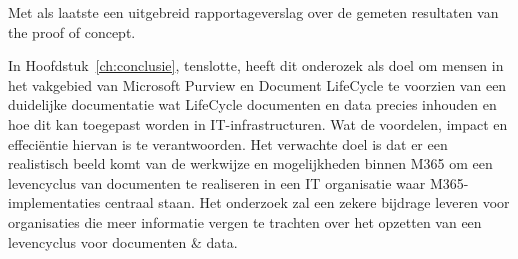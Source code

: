 Met als laatste een uitgebreid rapportageverslag over de gemeten resultaten van the proof of concept.



In Hoofdstuk~\ref{ch:conclusie}, tenslotte, heeft dit onderozek als doel om mensen in het vakgebied van Microsoft Purview en Document LifeCycle te voorzien van een duidelijke documentatie wat LifeCycle documenten en data precies inhouden en hoe dit kan toegepast worden in IT-infrastructuren. Wat de voordelen, impact en effeciëntie hiervan is te verantwoorden. Het verwachte doel is dat er een realistisch beeld komt van de werkwijze en mogelijkheden binnen M365 om een levencyclus van documenten te realiseren in een IT organisatie waar M365-implementaties centraal staan.
Het onderzoek zal een zekere bijdrage leveren voor organisaties die meer informatie vergen te trachten over het opzetten van een levencyclus voor documenten \& data.

